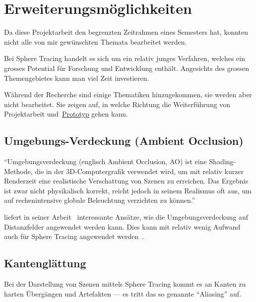 
\section{Erweiterungsmöglichkeiten}
\label{sec:further_work}

Da diese Projektarbeit den begrenzten Zeitrahmen eines Semesters
hat, konnten nicht alle von mir gewünschten Themata bearbeitet werden.

Bei Sphere Tracing handelt es sich um ein relativ junges
Verfahren, welches ein grosses Potential für Forschung und
Entwicklung enthält. Angesichts des grossen Themengebietes kann man viel
Zeit investieren.

Während der Recherche sind einige Thematiken hinzugekommen, sie werden
aber nicht bearbeitet. Sie zeigen auf, in welche Richtung die
Weiterführung von Projektarbeit und~\hyperref[chap:prototype]{Prototyp} gehen kann.

\subsection{Umgebungs-Verdeckung (Ambient Occlusion)}
\label{subsec:further_work:ambient_occlusion}

``Umgebungsverdeckung (englisch Ambient Occlusion, AO) ist eine
Shading-Methode, die in der 3D-Computergrafik verwendet wird, um mit
relativ kurzer Renderzeit eine realistische Verschattung von Szenen zu
erreichen. Das Ergebnis ist zwar nicht physikalisch korrekt, reicht
jedoch in seinem Realismus oft aus, um auf rechenintensive globale
Beleuchtung verzichten zu
können.''~\parencite{wikipedia_the_free_encyclopedia_umgebungsverdeckung_2015}

\citeauthor{evans_fast_2006} liefert in seiner
Arbeit~ interessante Ansätze, wie die
Umgebungsverdeckung auf Distanzfelder angewendet werden kann. Dies kann
mit relativ wenig Aufwand auch für Sphere Tracing angewendet
werden~\parencite{evans_fast_2006}.

\subsection{Kantenglättung}
\label{subsec:further_work:antialiasing}

Bei der Darstellung von Szenen mittels Sphere Tracing kommt es an Kanten
zu harten Übergängen und Artefakten --- es tritt das so genannte
``Aliasing'' auf.

